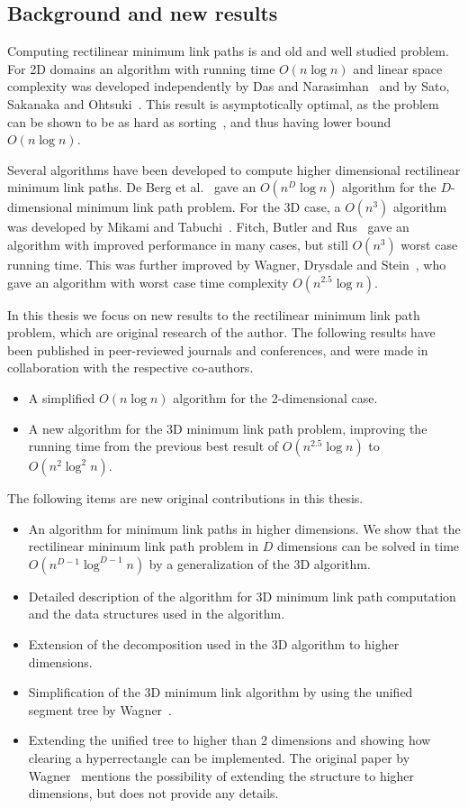 \documentclass[english,gradu]{tktltiki2018}
\begin{document}
\subsection{Background and new results}

Computing rectilinear minimum link paths is and old and well studied problem.
For 2D domains an algorithm with running time $O(n\log n)$ and linear space complexity was developed independently by Das and Narasimhan~\cite{dasnar} and by Sato, Sakanaka and Ohtsuki~\cite{sato}.
This result is asymptotically optimal, as the problem can be shown to be as hard as sorting~\cite{dasnar}, and thus having lower bound $O(n\log n)$.

Several algorithms have been developed to compute higher dimensional rectilinear minimum link paths.
De Berg et al.~\cite{de1992} gave an $O(n^D\log n)$ algorithm for the $D$-dimensional minimum link path problem.
For the 3D case, a $O(n^3)$ algorithm was developed by Mikami and Tabuchi~\cite{mikami}.
Fitch, Butler and Rus~\cite{fitch} gave an algorithm with improved performance in many cases, but still $O(n^3)$ worst case running time.
This was further improved by Wagner, Drysdale and Stein~\cite{wagner}, who gave an algorithm with worst case time complexity $O(n^{2.5}\log n)$.

In this thesis we focus on new results to the rectilinear minimum link path problem, which are original research of the author.
The following results have been published in peer-reviewed journals and conferences, and were made in collaboration with the respective co-authors.
\begin{itemize}
\item A simplified $O(n\log n)$ algorithm for the 2-dimensional case.
\item A new algorithm for the 3D minimum link path problem, improving the running time from the previous best result of $O(n^{2.5}\log n)$ to $O(n^2\log^2 n)$.
\end{itemize}

The following items are new original contributions in this thesis.

\begin{itemize}
\item An algorithm for minimum link paths in higher dimensions. We show that the rectilinear minimum link path problem in $D$ dimensions can be solved in time $O(n^{D-1}\log^{D-1} n)$ by a generalization of the 3D algorithm.
\item Detailed description of the algorithm for 3D minimum link path computation and the data structures used in the algorithm.
\item Extension of the decomposition used in the 3D algorithm to higher dimensions.
\item Simplification of the 3D minimum link algorithm by using the unified segment tree by Wagner~\cite{unified}.
\item Extending the unified tree to higher than 2 dimensions and showing how clearing a hyperrectangle can be implemented. The original paper by Wagner~\cite{unified} mentions the possibility of extending the structure to higher dimensions, but does not provide any details.
\end{itemize}
\end{document}
